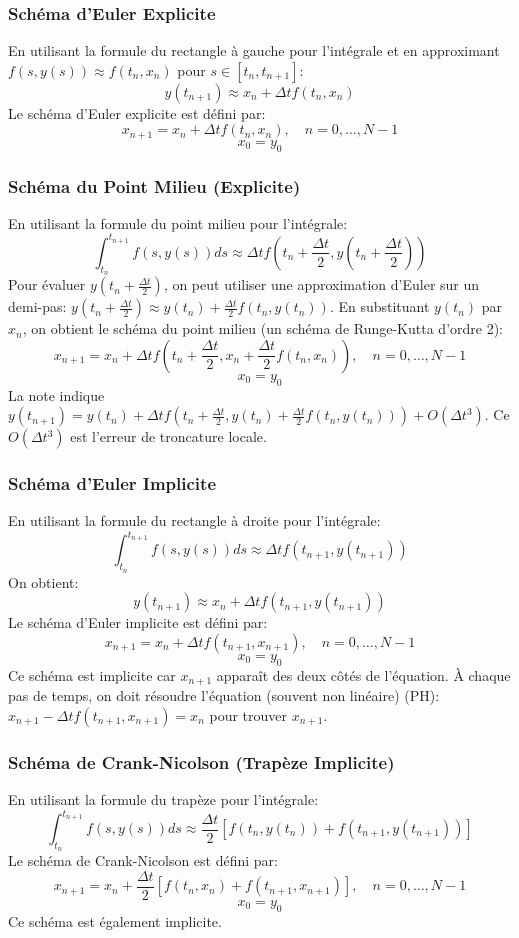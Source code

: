 \subsubsection{Schéma d'Euler Explicite}
\label{sssec:euler_explicite}
En utilisant la formule du rectangle à gauche pour l'intégrale et en approximant $f(s, y(s)) \approx f(t_n, x_n)$ pour $s \in [t_n, t_{n+1}]$:
\[ y(t_{n+1}) \approx x_n + \Delta t f(t_n, x_n) \]
Le schéma d'Euler explicite est défini par:
\[ x_{n+1} = x_n + \Delta t f(t_n, x_n), \quad n=0, \dots, N-1 \]
\[ x_0 = y_0 \]

\subsubsection{Schéma du Point Milieu (Explicite)}
\label{sssec:point_milieu}
En utilisant la formule du point milieu pour l'intégrale:
\[ \int_{t_n}^{t_{n+1}} f(s, y(s)) ds \approx \Delta t f(t_n + \frac{\Delta t}{2}, y(t_n + \frac{\Delta t}{2})) \]
Pour évaluer $y(t_n + \frac{\Delta t}{2})$, on peut utiliser une approximation d'Euler sur un demi-pas:
$y(t_n + \frac{\Delta t}{2}) \approx y(t_n) + \frac{\Delta t}{2} f(t_n, y(t_n))$.
En substituant $y(t_n)$ par $x_n$, on obtient le schéma du point milieu (un schéma de Runge-Kutta d'ordre 2):
\[ x_{n+1} = x_n + \Delta t f\left(t_n + \frac{\Delta t}{2}, x_n + \frac{\Delta t}{2} f(t_n, x_n)\right), \quad n=0, \dots, N-1 \]
\[ x_0 = y_0 \]
La note indique $y(t_{n+1}) = y(t_n) + \Delta t f(t_n + \frac{\Delta t}{2}, y(t_n) + \frac{\Delta t}{2} f(t_n, y(t_n))) + O(\Delta t^3)$. Ce $O(\Delta t^3)$ est l'erreur de troncature locale.

\subsubsection{Schéma d'Euler Implicite}
\label{sssec:euler_implicite}
En utilisant la formule du rectangle à droite pour l'intégrale:
\[ \int_{t_n}^{t_{n+1}} f(s, y(s)) ds \approx \Delta t f(t_{n+1}, y(t_{n+1})) \]
On obtient:
\[ y(t_{n+1}) \approx x_n + \Delta t f(t_{n+1}, y(t_{n+1})) \]
Le schéma d'Euler implicite est défini par:
\[ x_{n+1} = x_n + \Delta t f(t_{n+1}, x_{n+1}), \quad n=0, \dots, N-1 \]
\[ x_0 = y_0 \]
Ce schéma est implicite car $x_{n+1}$ apparaît des deux côtés de l'équation. À chaque pas de temps, on doit résoudre l'équation (souvent non linéaire) (PH):
$x_{n+1} - \Delta t f(t_{n+1}, x_{n+1}) = x_n$ pour trouver $x_{n+1}$.

\subsubsection{Schéma de Crank-Nicolson (Trapèze Implicite)}
\label{sssec:crank_nicolson}
En utilisant la formule du trapèze pour l'intégrale:
\[ \int_{t_n}^{t_{n+1}} f(s, y(s)) ds \approx \frac{\Delta t}{2} [f(t_n, y(t_n)) + f(t_{n+1}, y(t_{n+1}))] \]
Le schéma de Crank-Nicolson est défini par:
\[ x_{n+1} = x_n + \frac{\Delta t}{2} [f(t_n, x_n) + f(t_{n+1}, x_{n+1})], \quad n=0, \dots, N-1 \]
\[ x_0 = y_0 \]
Ce schéma est également implicite.

